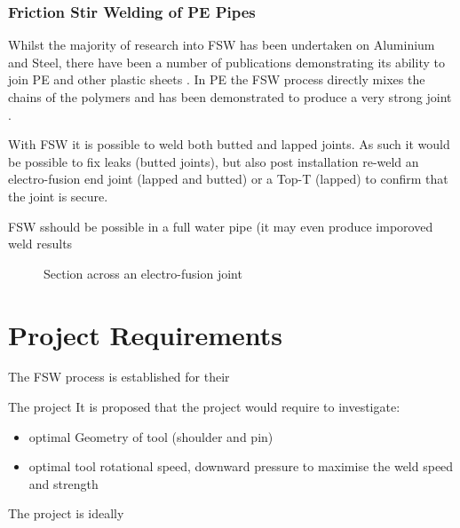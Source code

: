 \documentclass[	DIV=calc,%
							paper=a4,%
							fontsize=11pt,%
							twocolumn]{scrartcl}	 					%
\begin{document}
\subsubsection*{Friction Stir Welding of PE Pipes}
Whilst the majority of research into FSW has been undertaken on Aluminium and Steel, there have been a number of publications demonstrating its ability to join PE and other plastic sheets \cite{squeo2009friction,gao2014submerged}.  In PE the FSW process directly mixes the chains of the polymers and has been demonstrated to produce a very strong joint \cite{zafar2017friction}.


With FSW it is possible to weld both butted and lapped joints. As such it would be possible to fix leaks (butted joints), but also post installation re-weld an electro-fusion end joint (lapped and butted) or a Top-T (lapped) to confirm that the joint is secure. 

FSW sshould be possible in a full water pipe (it may even produce imporoved weld results \cite{gao2014submerged}

\begin{figure}[htp]
 \centering
 
 \caption{Section across an electro-fusion joint}
\end{figure}

\section*{Project Requirements}
The FSW process is established for their

The project 
It is proposed that the project would require to investigate:
\begin{itemize}
 \item optimal Geometry of tool (shoulder and pin)
 \item optimal tool rotational speed, downward pressure to maximise the weld speed and strength
\end{itemize}


The project is ideally 


{\footnotesize
}
\end{document}
